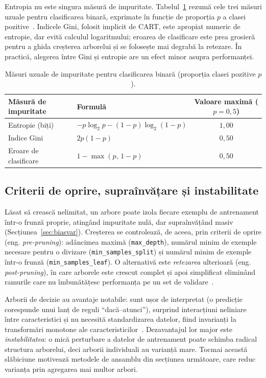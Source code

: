 \documentclass[12pt,a4paper]{report}
\begin{document}
Entropia nu este singura măsură de impuritate. Tabelul~\ref{tab:impuritate} rezumă cele trei
măsuri uzuale pentru clasificarea binară, exprimate în funcție de proporția $p$ a clasei
pozitive~\cite{breiman1984cart, hastie2009elements}. Indicele Gini, folosit implicit de CART,
este apropiat numeric de entropie, dar evită calculul logaritmului; eroarea de clasificare este
prea grosieră pentru a ghida creșterea arborelui și se folosește mai degrabă la retezare. În
practică, alegerea între Gini și entropie are un efect minor asupra performanței.

\begin{table}[htbp]
  \centering
  \begin{tabular}{l l c}
    \toprule
    \textbf{Măsură de impuritate} & \textbf{Formulă} & \textbf{Valoare maximă ($p = 0{,}5$)} \\
    \midrule
    Entropie (biți)        & $-p\log_2 p - (1-p)\log_2(1-p)$ & $1{,}00$ \\
    Indice Gini            & $2p(1-p)$                       & $0{,}50$ \\
    Eroare de clasificare  & $1 - \max(p,\,1-p)$             & $0{,}50$ \\
    \bottomrule
  \end{tabular}
  \caption{Măsuri uzuale de impuritate pentru clasificarea binară (proporția clasei pozitive $p$).}
  \label{tab:impuritate}
\end{table}

\subsection{Criterii de oprire, supraînvățare și instabilitate}

Lăsat să crească nelimitat, un arbore poate izola fiecare exemplu de antrenament într-o frunză
proprie, atingând impuritate nulă, dar supraînvățând masiv (Secțiunea~\ref{sec:biasvar}).
Creșterea se controlează, de aceea, prin criterii de oprire (eng. \emph{pre-pruning}): adâncimea
maximă (\texttt{max\_depth}), numărul minim de exemple necesare pentru o divizare
(\texttt{min\_samples\_split}) și numărul minim de exemple într-o frunză
(\texttt{min\_samples\_leaf}). O alternativă este \emph{retezarea} ulterioară (eng.
\emph{post-pruning}), în care arborele este crescut complet și apoi simplificat eliminând
ramurile care nu îmbunătățesc performanța pe un set de validare~\cite{breiman1984cart}.

Arborii de decizie au avantaje notabile: sunt ușor de interpretat (o predicție corespunde unui
lanț de reguli ``dacă--atunci''), surprind interacțiuni neliniare între caracteristici și nu
necesită standardizarea datelor, fiind invarianți la transformări monotone ale
caracteristicilor~\cite{james2013introduction}. Dezavantajul lor major este \emph{instabilitatea}:
o mică perturbare a datelor de antrenament poate schimba radical structura arborelui, deci
arborii individuali au varianță mare. Tocmai această slăbiciune motivează metodele de ansamblu
din secțiunea următoare, care reduc varianța prin agregarea mai multor arbori.
\end{document}
